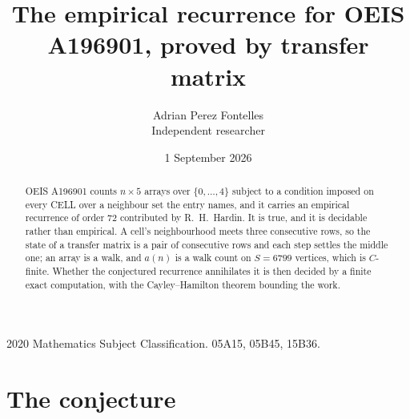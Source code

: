 \documentclass[11pt,a4paper]{article}
\title{The empirical recurrence for OEIS A196901, proved by transfer matrix}
\author{Adrian Perez Fontelles\\ \small Independent researcher}
\date{1 September 2026}
\theoremstyle{plain}
\theoremstyle{definition}
\begin{document}
\maketitle

\begin{abstract}
OEIS A196901 counts $n\times5$ arrays over $\{0,\dots,4\}$ subject to a condition imposed on
every CELL over a neighbour set the entry names, and it carries an empirical recurrence of
order $72$ contributed by R.~H.~Hardin. It is true, and it is decidable rather than
empirical. A cell's neighbourhood meets three consecutive rows, so the state of a transfer
matrix is a pair of consecutive rows and each step settles the middle one; an array is a
walk, and $a(n)$ is a walk count on $S=6799$ vertices, which is $C$-finite. Whether the
conjectured recurrence annihilates it is then decided by a finite exact computation, with the
Cayley--Hamilton theorem bounding the work.
\end{abstract}

\noindent\small 2020 Mathematics Subject Classification. 05A15, 05B45, 15B36.\normalsize

\section{The conjecture}
\end{document}
